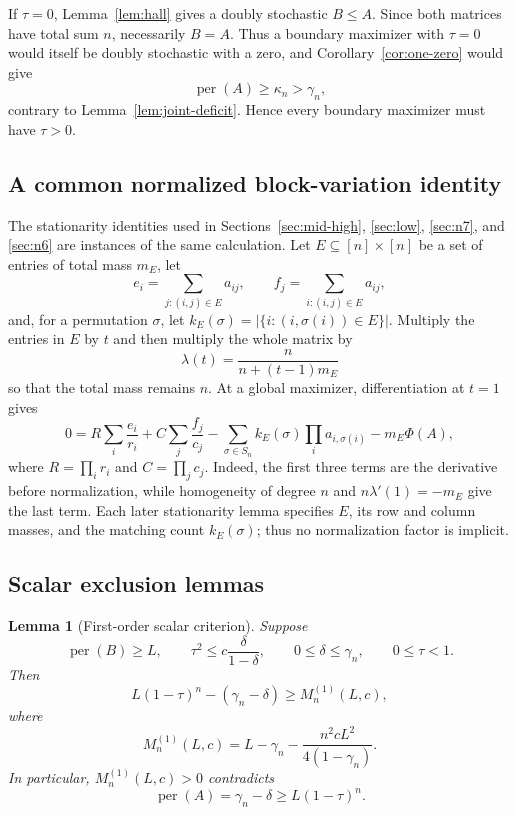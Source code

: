 \documentclass[11pt,a4paper]{article}
\numberwithin{equation}{section}
\newtheorem{lemma}[theorem]{Lemma}
\theoremstyle{definition}
\newcommand{\per}{\operatorname{per}}
\newcommand{\1}{\mathbf{1}}
\begin{document}
If $\tau=0$, Lemma~\ref{lem:hall} gives a doubly stochastic $B\le A$.  Since both matrices have total sum $n$, necessarily $B=A$.  Thus a boundary maximizer with $\tau=0$ would itself be doubly stochastic with a zero, and Corollary~\ref{cor:one-zero} would give
\[
 \per(A)\ge\kappa_n>\gamma_n,
\]
contrary to Lemma~\ref{lem:joint-deficit}.  Hence every boundary maximizer must have $\tau>0$.

\subsection{A common normalized block-variation identity}
The stationarity identities used in Sections~\ref{sec:mid-high},
\ref{sec:low}, \ref{sec:n7}, and \ref{sec:n6} are instances of the same
calculation.  Let $E\subseteq[n]\times[n]$ be a set of entries of total mass
$m_E$, let
\[
 e_i=\sum_{j:(i,j)\in E}a_{ij},\qquad
 f_j=\sum_{i:(i,j)\in E}a_{ij},
\]
and, for a permutation $\sigma$, let
$k_E(\sigma)=|\{i:(i,\sigma(i))\in E\}|$.  Multiply the entries in $E$ by
$t$ and then multiply the whole matrix by
\[
 \lambda(t)=\frac{n}{n+(t-1)m_E}
\]
so that the total mass remains $n$.  At a global maximizer, differentiation
at $t=1$ gives
\begin{equation}\label{eq:normalized-block-variation}
 0=
 R\sum_i\frac{e_i}{r_i}
 +C\sum_j\frac{f_j}{c_j}
 -\sum_{\sigma\in S_n}k_E(\sigma)
    \prod_i a_{i,\sigma(i)}
 -m_E\Phi(A),
\end{equation}
where $R=\prod_i r_i$ and $C=\prod_jc_j$.  Indeed, the first three terms
are the derivative before normalization, while homogeneity of degree $n$
and $n\lambda'(1)=-m_E$ give the last term.  Each later stationarity lemma
specifies $E$, its row and column masses, and the matching count
$k_E(\sigma)$; thus no normalization factor is implicit.

\subsection{Scalar exclusion lemmas}

\begin{lemma}[First-order scalar criterion]\label{lem:first-order}
Suppose
\[
 \per(B)\ge L,
 \qquad
 \tau^2\le c\frac{\delta}{1-\delta},
 \qquad
 0\le\delta\le\gamma_n,
 \qquad
 0\le\tau<1.
\]
Then
\begin{equation}\label{eq:first-margin}
 L(1-\tau)^n-(\gamma_n-\delta)
 \ge
 M_n^{(1)}(L,c),
\end{equation}
where
\begin{equation}\label{eq:M1}
 M_n^{(1)}(L,c)
 =L-\gamma_n-
 \frac{n^2cL^2}{4(1-\gamma_n)}.
\end{equation}
In particular, $M_n^{(1)}(L,c)>0$ contradicts
\[
 \per(A)=\gamma_n-\delta
 \ge L(1-\tau)^n.
\]
\end{lemma}
\end{document}
